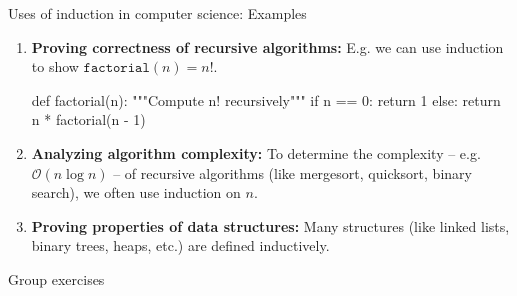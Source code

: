 \documentclass[10pt]{beamer}
\begin{document}
\begin{frame}[fragile]{Uses of induction in computer science: Examples}
\small 
\begin{enumerate}
	\item \textbf{Proving correctness of recursive algorithms:} E.g. we can use induction to show $\texttt{factorial}(n)=n!$.
\begin{python}
def factorial(n):
    """Compute n! recursively"""
    if n == 0:
        return 1
    else:
        return n * factorial(n - 1)
\end{python}
\pause 
\item \textbf{Analyzing algorithm complexity:} To determine the complexity -- e.g. $\mathcal{O}(n \log n)$ -- of recursive algorithms (like mergesort, quicksort, binary search),  we often use induction on  $n$.
\pause 
\item \textbf{Proving properties of data structures:} Many structures (like linked lists, binary trees, heaps, etc.) are defined inductively.
\end{enumerate}
\end{frame}



\begin{frame}[standout]
Group exercises
\end{frame}
\end{document}
